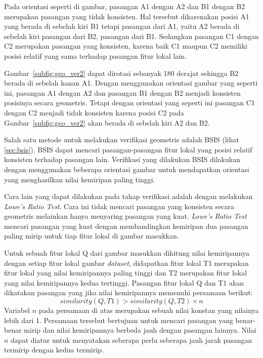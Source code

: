 Pada orientasi seperti di gambar, pasangan A1 dengan A2 dan B1 dengan B2 merupakan pasangan yang tidak konsisten. Hal tersebut dikarenakan posisi A1 yang berada di sebelah kiri B1 tetapi pasangan dari A1, yaitu A2 berada di sebelah kiri pasangan dari B2, pasangan dari B1. Sedangkan pasangan C1 dengan C2 merupakan pasangan yang konsisten, karena baik C1 maupun C2 memiliki posisi relatif yang sama terhadap pasangan fitur lokal lain.

Gambar~\ref{subfig:geo_ver2} dapat dirotasi sebanyak 180 derajat sehingga B2 berada di sebelah kanan A1. Dengan menggunakan orientasi gambar yang seperti ini, pasangan A1 dengan A2 dan pasangan B1 dengan B2 menjadi konsisten posisinya secara geometris. Tetapi dengan orientasi yang seperti ini pasangan C1 dengan C2 menjadi tidak konsisten karena posisi C2 pada Gambar~\ref{subfig:geo_ver2} akan berada di sebelah kiri A2 dan B2.

Salah satu metode untuk melakukan verifikasi geometris adalah BSIS (lihat \ref{sec:bsis}). BSIS dapat mencari pasangan-pasangan fitur lokal yang posisi relatif konsisten terhadap pasangan lain. Verifikasi yang dilakukan BSIS dilakukan dengan menggunakan beberapa orientasi gambar untuk mendapatkan orientasi yang menghasilkan nilai kemiripan paling tinggi.

Cara lain yang dapat dilakukan pada tahap verifikasi adalah dengan melakukan \textit{Lowe's Ratio Test}. Cara ini tidak mencari pasangan yang konsisten secara geometris melainkan hanya menyaring pasangan yang kuat. \textit{Lowe's Ratio Test} mencari pasangan yang kuat dengan membandingkan kemiripan dua pasangan paling mirip untuk tiap fitur lokal di gambar masukkan. 

Untuk sebuah fitur lokal Q dari gambar masukkan dihitung nilai kemiripannya dengan setiap fitur lokal gambar \textit{dataset}, didapatkan fitur lokal T1 merupakan fitur lokal yang nilai kemiripannya paling tinggi dan T2 merupakan fitur lokal yang nilai kemiripannya kedua tertinggi. Pasangan fitur lokal Q dan T1 akan dikatakan pasangan yang jika nilai kemiripannya memenuhi persamaan berikut:
\begin{equation}
	similarity(Q, T1) > similarity(Q, T2) \times n
\end{equation}
Variabel $n$ pada persamaan di atas merupakan sebuah nilai konstan yang nilainya lebih dari 1. Persamaan tersebut bertujuan untuk mencari pasangan yang benar-benar mirip dan nilai kemiripannya berbeda jauh dengan pasangan lainnya. Nilai $n$ dapat diatur untuk menyatakan seberapa perlu seberapa jauh jarak pasangan termirip dengan kedua termirip.

